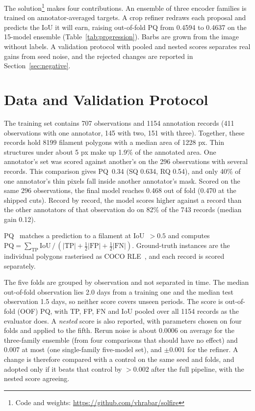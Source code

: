 \documentclass[sigconf,pbalance]{acmart}
\begin{document}
    The solution\footnote{Code and weights: \url{https://github.com/vhrabar/solfire}} makes four contributions.
    An ensemble of three encoder families is trained on annotator-averaged targets.
    A crop refiner redraws each proposal and predicts the IoU it will earn, raising out-of-fold PQ from 0.4594 to 0.4637 on the 15-model ensemble (Table~\ref{tab:progression}).
    Barbs are grown from the image without labels.
    A validation protocol with pooled and nested scores separates real gains from seed noise, and the rejected changes are reported in Section~\ref{sec:negative}.


\section{Data and Validation Protocol}\label{sec:data}
    The training set contains 707 observations and 1154 annotation records (411 observations with one annotator, 145 with two, 151 with three).
    Together, these records hold 8199 filament polygons with a median area of 1228 px.
    Thin structures under about 5 px make up 1.9\% of the annotated area.
    One annotator's set was scored against another's on the 296 observations with several records.
    This comparison gives PQ~0.34 (SQ 0.634, RQ 0.54), and only 40\% of one annotator's thin pixels fall inside another annotator's mask.
    Scored on the same 296 observations, the final model reaches 0.468 out of fold (0.470 at the shipped cuts).
    Record by record, the model scores higher against a record than the other annotators of that observation do on 82\% of the 743 records (median gain 0.12).

    PQ~\cite{kirillov2019panoptic} matches a prediction to a filament at IoU~$>0.5$ and computes $\mathrm{PQ}=\sum_{\mathrm{TP}}\mathrm{IoU}\,/\,(|\mathrm{TP}|+\tfrac12|\mathrm{FP}|+\tfrac12|\mathrm{FN}|)$.
    Ground-truth instances are the individual polygons rasterised as COCO RLE~\cite{lin2014coco}, and each record is scored separately.

    The five folds are grouped by observation and not separated in time.
    The median out-of-fold observation lies 2.0 days from a training one and the median test observation 1.5 days, so neither score covers unseen periods.
    The score is out-of-fold (OOF) PQ, with TP, FP, FN and IoU pooled over all 1154 records as the evaluator does.
    A \emph{nested} score is also reported, with parameters chosen on four folds and applied to the fifth.
    Rerun noise is about 0.0006 on average for the three-family ensemble (from four comparisons that should have no effect) and 0.007 at most (one single-family five-model set), and $\pm0.001$ for the refiner.
    A change is therefore compared with a control on the same seed and folds, and adopted only if it beats that control by $>0.002$ after the full pipeline, with the nested score agreeing.
\end{document}
